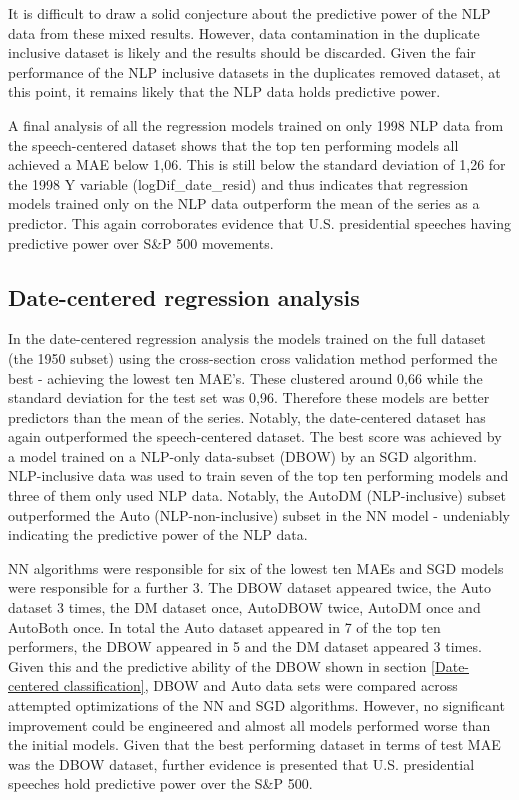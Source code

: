 \documentclass[11pt,preprint, authoryear]{elsarticle}
\numberwithin{equation}{section}
\numberwithin{figure}{section}
\numberwithin{table}{section}
\begin{document}
It is difficult to draw a solid conjecture about the predictive power of
the NLP data from these mixed results. However, data contamination in
the duplicate inclusive dataset is likely and the results should be
discarded. Given the fair performance of the NLP inclusive datasets in
the duplicates removed dataset, at this point, it remains likely that
the NLP data holds predictive power.

A final analysis of all the regression models trained on only 1998 NLP
data from the speech-centered dataset shows that the top ten performing
models all achieved a MAE below 1,06. This is still below the standard
deviation of 1,26 for the 1998 Y variable (logDif\_date\_resid) and thus
indicates that regression models trained only on the NLP data outperform
the mean of the series as a predictor. This again corroborates evidence
that U.S. presidential speeches having predictive power over S\&P 500
movements.

\hypertarget{date-centered-regression-analysis}{%
\subsection{Date-centered regression
analysis}\label{date-centered-regression-analysis}}

In the date-centered regression analysis the models trained on the full
dataset (the 1950 subset) using the cross-section cross validation
method performed the best - achieving the lowest ten MAE's. These
clustered around 0,66 while the standard deviation for the test set was
0,96. Therefore these models are better predictors than the mean of the
series. Notably, the date-centered dataset has again outperformed the
speech-centered dataset. The best score was achieved by a model trained
on a NLP-only data-subset (DBOW) by an SGD algorithm. NLP-inclusive data
was used to train seven of the top ten performing models and three of
them only used NLP data. Notably, the AutoDM (NLP-inclusive) subset
outperformed the Auto (NLP-non-inclusive) subset in the NN model -
undeniably indicating the predictive power of the NLP data.

NN algorithms were responsible for six of the lowest ten MAEs and SGD
models were responsible for a further 3. The DBOW dataset appeared
twice, the Auto dataset 3 times, the DM dataset once, AutoDBOW twice,
AutoDM once and AutoBoth once. In total the Auto dataset appeared in 7
of the top ten performers, the DBOW appeared in 5 and the DM dataset
appeared 3 times. Given this and the predictive ability of the DBOW
shown in section \ref{Date-centered classification}, DBOW and Auto data
sets were compared across attempted optimizations of the NN and SGD
algorithms. However, no significant improvement could be engineered and
almost all models performed worse than the initial models. Given that
the best performing dataset in terms of test MAE was the DBOW dataset,
further evidence is presented that U.S. presidential speeches hold
predictive power over the S\&P 500.
\end{document}
